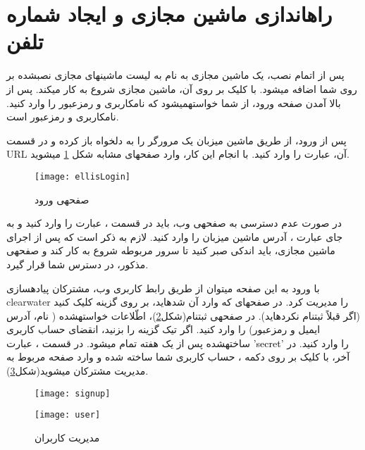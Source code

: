 \section{راه\nf اندازی ماشین مجازی و ایجاد شماره تلفن}
پس از اتمام نصب، یک ماشین مجازی به نام  به لیست ماشین\nf های مجازی نصب\nf شده بر روی  شما اضافه می\nf شود. با کلیک بر روی آن، ماشین مجازی  شروع به کار می\nf کند. پس از بالا آمدن صفحه ورود، از شما خواسته\nf می\nf شود که نام\nf کاربری و رمزعبور را وارد کنید. نام\nf کاربری  \lr{\textcolor{black}{'ubuntu'}} و رمزعبور \lr{\textcolor{black}{'cw-aio'}} است.


پس از ورود، از طریق ماشین میزبان یک مرورگر را به دلخواه باز کرده و در قسمت URL آن، عبارت  \href{http://localhost:8080}{\lr{\textcolor{blue}{http://localhost:8080}}} را وارد کنید. با انجام این کار، وارد صفحه\nf ای مشابه شکل \ref{ellisLogin} می\nf شوید. 
\begin{figure}[H]
\centering
\texttt{[image: ellisLogin]}
\caption{صفحه\nf ی ورود}
\label{ellisLogin}
\end{figure}
در صورت عدم دسترسی به صفحه\nf ی وب، باید در قسمت ، عبارت  را وارد کنید و به جای عبارت ، آدرس  ماشین میزبان را وارد کنید. لازم به ذکر است که پس از اجرای ماشین مجازی، باید اندکی صبر کنید تا سرور مربوطه شروع به کار کند و صفحه\nf ی مذکور، در دسترس شما قرار گیرد. 

 با ورود به این صفحه می\nf توان از طریق رابط کاربری وب، مشترکان پیاده\nf سازی clearwater  را مدیریت کرد. در صفحه\nf ای که وارد آن شده\nf اید، بر روی گزینه  کلیک کنید (اگر قبلاً ثبت\nf نام نکرده\nf اید). در صفحه\nf ی ثبت\nf نام(شکل\ref{signup})، اطّلاعات خواسته\nf شده ( نام، آدرس ایمیل و رمزعبور) را وارد کنید. اگر تیک گزینه  را بزنید، انقضای حساب کاربری ساخته\nf شده پس از یک هفته تمام می\nf شود. در قسمت ، عبارت \textcolor{black}{'secret'} را وارد کنید. در آخر، با کلیک بر روی دکمه ، حساب کاربری شما ساخته شده و وارد صفحه مربوط به مدیریت مشترکان می\nf شوید(شکل\ref{user}).

\begin{figure}[h]
\centering
\texttt{[image: signup]}
\caption{}
\label{signup}
\end{figure}


\begin{figure}[H]
\centering
\texttt{[image: user]}
\caption{مدیریت کاربران}
\label{user}
\end{figure}

